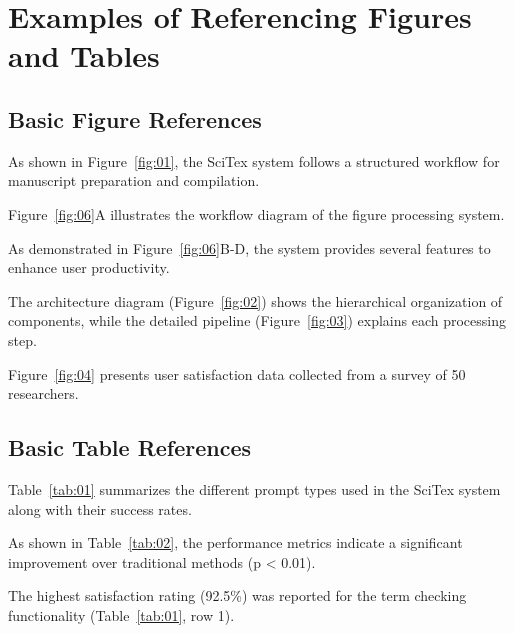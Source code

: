 

\section{Examples of Referencing Figures and Tables}

\subsection{Basic Figure References}

As shown in Figure~\ref{fig:01}, the SciTex system follows a structured workflow for manuscript preparation and compilation.

Figure~\ref{fig:06}A illustrates the workflow diagram of the figure processing system.

As demonstrated in Figure~\ref{fig:06}B-D, the system provides several features to enhance user productivity.

The architecture diagram (Figure~\ref{fig:02}) shows the hierarchical organization of components, while the detailed pipeline (Figure~\ref{fig:03}) explains each processing step.

Figure~\ref{fig:04} presents user satisfaction data collected from a survey of 50 researchers.

\subsection{Basic Table References}

Table~\ref{tab:01} summarizes the different prompt types used in the SciTex system along with their success rates.

As shown in Table~\ref{tab:02}, the performance metrics indicate a significant improvement over traditional methods (p < 0.01).

The highest satisfaction rating (92.5\%) was reported for the term checking functionality (Table~\ref{tab:01}, row 1).

